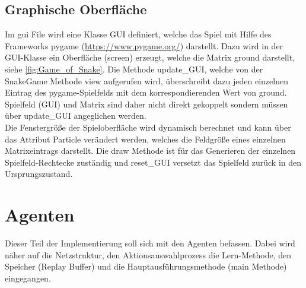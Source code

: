 \subsection{Graphische Oberfläche}
Im gui File wird eine Klasse GUI definiert, welche das Spiel mit Hilfe des Frameworks pygame (\url{https://www.pygame.org/}) darstellt. Dazu wird in der GUI-Klasse ein Oberfläche (screen) erzeugt, welche die Matrix ground darstellt, siehe \ref{fig:Game_of_Snake}. 
Die Methode update\_GUI, welche von der SnakeGame Methode view aufgerufen wird, überschreibt dazu jeden einzelnen Eintrag des pygame-Spielfelds mit dem korrespondierenden Wert von ground. 
Spielfeld (GUI) und Matrix sind daher nicht direkt gekoppelt sondern müssen über update\_GUI angeglichen werden.\\
Die Fenstergröße der Spieloberfläche wird dynamisch berechnet und kann über das Attribut Particle verändert werden, welches die Feldgröße eines einzelnen Matrixeintrags darstellt. 
Die draw Methode ist für das Generieren der einzelnen Spielfeld-Rechtecke zuständig und reset\_GUI versetzt das Spielfeld zurück in den Ursprungszustand.


\section{Agenten}
Dieser Teil der Implementierung soll sich mit den Agenten befassen. Dabei wird näher auf die Netzstruktur, den Aktionsauswahlprozess die Lern-Methode, den Speicher (Replay Buffer) und die Hauptausführungsmethode (main Methode) eingegangen.

